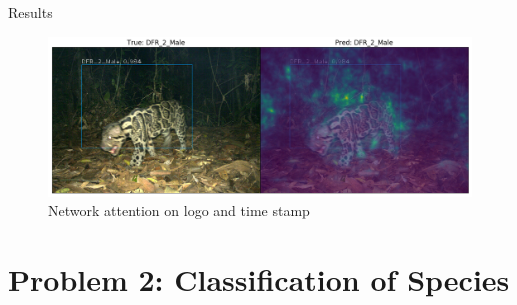 \documentclass[10pt]{beamer}
\begin{document}

\begin{frame}{Results}
	\begin{figure}
		\includegraphics[width=\columnwidth]{images/RetinaNet_No_Attention_correct2.png}
		\caption{Network attention on logo and time stamp}
	\end{figure}
\end{frame}

\section{Problem 2: Classification of Species}
\end{document}
